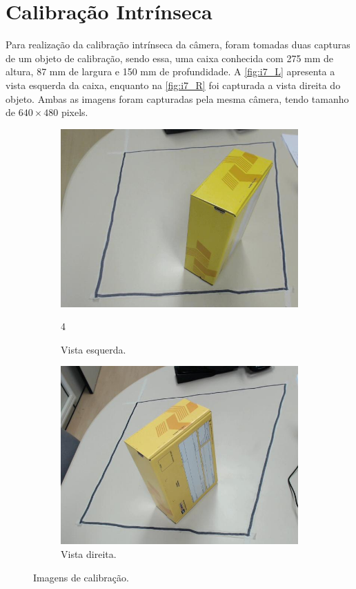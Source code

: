 
\section{Calibração Intrínseca}

Para realização da calibração intrínseca da câmera, foram tomadas duas capturas de um objeto de calibração, sendo essa, uma caixa conhecida com 275 mm de altura, 87 mm de largura e 150 mm de profundidade. A \autoref{fig:i7_L} apresenta a vista esquerda da caixa, enquanto na \autoref{fig:i7_R} foi capturada a vista direita do objeto. Ambas as imagens foram capturadas pela mesma câmera, tendo tamanho de $640 \times 480$ pixels.

\begin{figure}[H]
	\centering
	\begin{subfigure}[H]{0.49\textwidth}
		\includegraphics[width = \textwidth]{../../data/i7_L.jpg}
		\caption{Vista esquerda.}
		\label{fig:i7_L}4
	\end{subfigure}
	\begin{subfigure}[H]{0.49\textwidth}
		\centering
		\includegraphics[width = \textwidth]{../../data/i7_R.jpg}
		\caption{Vista direita.}
		\label{fig:i7_R}
	\end{subfigure}
	\caption{Imagens de calibração.}
\end{figure}

